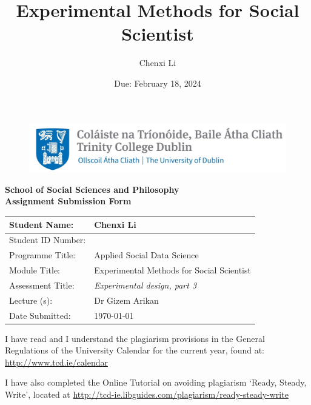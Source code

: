 \documentclass[12pt]{article} %
\title{Experimental Methods for Social Scientist }
\date{Due: February 18, 2024}
\author{Chenxi Li}
\begin{document}
\begin{figure}[h]
	\centering
	\vspace{-2.5cm}
	\hspace{-8cm}
	\includegraphics[width=12cm]{Trinity_icon.jpg}  
\end{figure}

\vspace{.5cm}
\begin{center}
    {\fontsize{17.28}{22}\selectfont\bfseries School of Social Sciences and Philosophy} \\
    {\fontsize{17.28}{22}\selectfont\bfseries Assignment Submission Form}
\end{center}

\vspace{.7cm}


\begin{center}
		\begin{tabular}{|>{\arraybackslash}p{4cm}|>{\arraybackslash}p{8cm}|}
			\hline
			Student Name: & Chenxi Li\\
			\hline
			Student ID Number: & 23330541 \\
			\hline
			Programme Title: & Applied Social Data Science \\
			\hline
			Module Title: & Experimental Methods for Social Scientist \\
			\hline
			Assessment Title: & \textit{Experimental design, part 3 }\\
			\hline
			Lecture (s): & Dr Gizem Arikan \\
			\hline
			Date Submitted: & \today \\
			\hline
		\end{tabular}
\end{center}

\vspace{.7cm}

\noindent I have read and I understand the plagiarism provisions in the General Regulations of the University Calendar for the current year, found at:  \url{http://www.tcd.ie/calendar} 
\par
\noindent I have also completed the Online Tutorial on avoiding plagiarism ‘Ready, Steady, Write’, located at \url{http://tcd-ie.libguides.com/plagiarism/ready-steady-write} 
\end{document}
